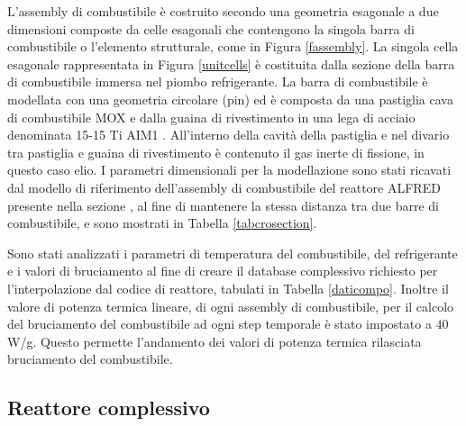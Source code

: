 L'assembly di combustibile è costruito secondo una geometria esagonale a due 
dimensioni
composte da celle esagonali che contengono la singola barra di combustibile o 
l'elemento strutturale, come in Figura \ref{fassembly}.
La singola cella esagonale rappresentata in Figura \ref{unitcells} è costituita 
dalla 
sezione della barra di combustibile immersa nel piombo refrigerante. La barra 
di combustibile è modellata con una geometria circolare (pin) ed è composta da 
una pastiglia cava
di combustibile MOX e dalla guaina di rivestimento in una lega di acciaio 
denominata 15-15 Ti AIM1 \cite{angiolini2017specifica}.
All'interno della cavità della pastiglia e nel divario tra pastiglia e guaina 
di 
rivestimento è contenuto il gas inerte di fissione, in questo caso elio.
I parametri dimensionali per la modellazione sono stati ricavati dal modello di 
riferimento dell'assembly 
di combustibile del reattore ALFRED presente nella sezione 
\label{alfredsection}, al fine di mantenere 
la stessa distanza tra due barre di combustibile, e sono mostrati in Tabella 
\ref{tabcrosection}.

Sono stati analizzati i parametri di temperatura del combustibile, del 
refrigerante e i valori di bruciamento 
al fine di creare il database complessivo richiesto 
per l'interpolazione dal codice di reattore, tabulati in Tabella 
\ref{daticompo}.
Inoltre il valore di potenza termica lineare, di ogni assembly di 
combustibile, per il calcolo del bruciamento del combustibile ad ogni step 
temporale è stato impostato a $40$W/g. Questo permette l'andamento dei valori 
di potenza termica rilasciata  bruciamento del combustibile.


\subsection{Reattore complessivo}

